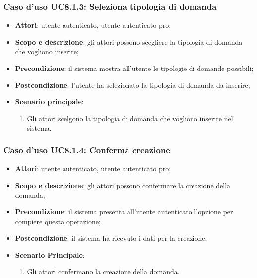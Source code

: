 	\subsubsection{Caso d'uso UC8.1.3: Seleziona tipologia di domanda}
	\begin{itemize}
		\item
			\textbf{Attori}: utente autenticato, utente autenticato pro;
		\item
			\textbf{Scopo e descrizione}: gli attori possono scegliere la tipologia di domanda che vogliono inserire;
		\item		
			\textbf{Precondizione}: il sistema mostra all'utente le tipologie di domande possibili;
		\item
			\textbf{Postcondizione}: l'utente ha selezionato la tipologia di domanda da inserire;
		\item
			\textbf{Scenario principale}:
				\begin{enumerate}
					\item 	
						Gli attori scelgono la tipologia di domanda che vogliono inserire nel sistema.	
				\end{enumerate}
	\end{itemize}










	\subsubsection{Caso d'uso UC8.1.4: Conferma creazione}
	\begin{itemize}
		\item
			\textbf{Attori}: utente autenticato, utente autenticato pro;
		\item
			\textbf{Scopo e descrizione}: gli attori possono confermare la creazione della domanda;
		\item		
			\textbf{Precondizione}: il sistema presenta all'utente autenticato l'opzione per compiere questa operazione;
		\item
			\textbf{Postcondizione}: il sistema ha ricevuto i dati per la creazione;
		\item
			\textbf{Scenario Principale}:  
					\begin{enumerate}
						\item
							Gli attori confermano la creazione della domanda.
					\end{enumerate}
	\end{itemize}	
